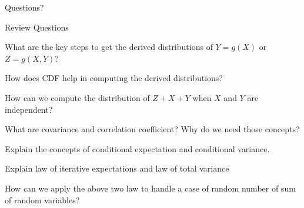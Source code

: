 \begin{frame}{}
\vspace{2cm}
\LARGE Questions?

\end{frame}

\begin{frame}{Review Questions}

\plitemsep 0.05in


  \bce[1)]
\item What are the key steps to get the derived distributions of
  $Y=g(X)$ or $Z=g(X,Y)$?

\item How does CDF help in computing the derived distributions?

\item How can we compute the distribution of $Z+X+Y$ when $X$ and $Y$ are independent?

\item What are covariance and correlation coefficient? Why do we need
  those concepts?

\item Explain the concepts of conditional expectation and
  conditional variance.

\item Explain law of iterative expectations and law of total variance
  
\item How can we apply the above two law to handle a case of random
  number of sum of random variables?

  \ece

\end{frame}


